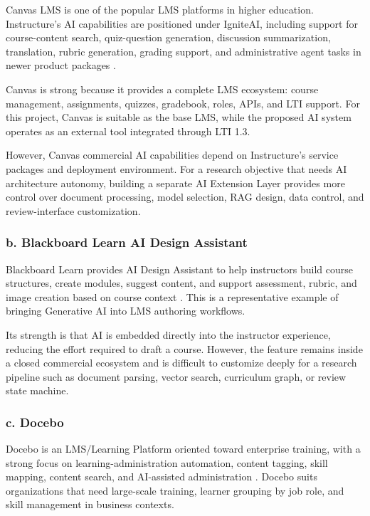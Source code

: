 Canvas LMS is one of the popular LMS platforms in higher education.
Instructure's AI capabilities are positioned under IgniteAI, including support
for course-content search, quiz-question generation, discussion summarization,
translation, rubric generation, grading support, and administrative agent tasks
in newer product packages \cite{instructure-ai}.

Canvas is strong because it provides a complete LMS ecosystem: course
management, assignments, quizzes, gradebook, roles, APIs, and LTI support. For
this project, Canvas is suitable as the base LMS, while the proposed AI system
operates as an external tool integrated through LTI 1.3.

However, Canvas commercial AI capabilities depend on Instructure's service
packages and deployment environment. For a research objective that needs AI
architecture autonomy, building a separate AI Extension Layer provides more
control over document processing, model selection, RAG design, data control,
and review-interface customization.

\subsubsection*{b. Blackboard Learn AI Design Assistant}

Blackboard Learn provides AI Design Assistant to help instructors build course
structures, create modules, suggest content, and support assessment, rubric,
and image creation based on course context \cite{blackboard-ai}. This is a
representative example of bringing Generative AI into LMS authoring workflows.

Its strength is that AI is embedded directly into the instructor experience,
reducing the effort required to draft a course. However, the feature remains
inside a closed commercial ecosystem and is difficult to customize deeply for a
research pipeline such as document parsing, vector search, curriculum graph, or
review state machine.

\subsubsection*{c. Docebo}

Docebo is an LMS/Learning Platform oriented toward enterprise training, with a
strong focus on learning-administration automation, content tagging, skill
mapping, content search, and AI-assisted administration \cite{docebo-ai}.
Docebo suits organizations that need large-scale training, learner grouping by
job role, and skill management in business contexts.

